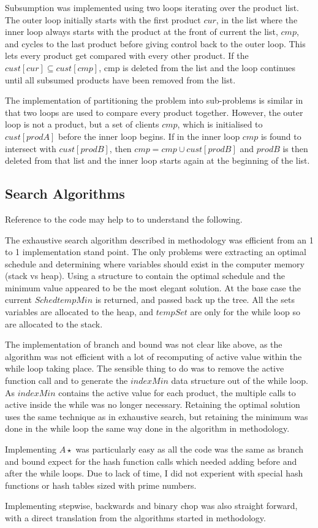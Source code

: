 Subsumption was implemented using two loops iterating over the product list.
The outer loop initially starts with the first product $cur$, in the list where
the inner loop always starts with the product at the front of current the list,
$cmp$, and cycles to the last product before giving control back to the outer
loop. This lets every product get compared with every other product. If the
$cust[cur] \subseteq cust[cmp]$, cmp is deleted from the list and the loop
continues until all subsumed products have been removed from the list.

The implementation of partitioning the problem into sub-problems is similar in
that two loops are used to compare every product together. However, the outer
loop is not a product, but a set of clients $cmp$, which is initialised to
$cust[prodA]$ before the inner loop begins. If in the inner loop $cmp$ is found
to intersect with $cust[prodB]$, then $cmp = cmp \cup cust[prodB]$ and $prodB$
is then deleted from that list and the inner loop starts again at the beginning
of the list.

\subsection{Search Algorithms}
Reference to the code may help to to understand the following.

The exhaustive search algorithm described in methodology was
efficient from an 1 to 1 implementation stand point. The only problems were
extracting an optimal schedule and determining where variables should exist in
the computer memory (stack vs heap). Using a structure to contain the optimal
schedule and the minimum value appeared to be the most elegant solution. At the
base case the current $Sched tempMin$ is returned, and passed back up the tree.
All the sets variables are allocated to the heap, and $tempSet$ are only for the
while loop so are allocated to the stack.

The implementation of branch and bound was not clear like above, as the
algorithm was not efficient with a lot of recomputing of active value within
the while loop taking place. The sensible thing to do was to remove the active
function call and to generate the $indexMin$ data structure out of the while
loop. As $indexMin$ contains the active value for each product, the multiple
calls to active inside the while was no longer necessary. Retaining the optimal
solution uses the same technique as in exhaustive search, but retaining the
minimum was done in the while loop the same way done in the algorithm in
methodology.

Implementing $A\star$ was particularly easy as all the code was the same as
branch and bound expect for the hash function calls which needed adding before
and after the while loops. Due to lack of time, I did not experient with
special hash functions or hash tables sized with prime numbers.

Implementing stepwise, backwards and binary chop was also straight forward,
with a direct translation from the algorithms started in methodology.
